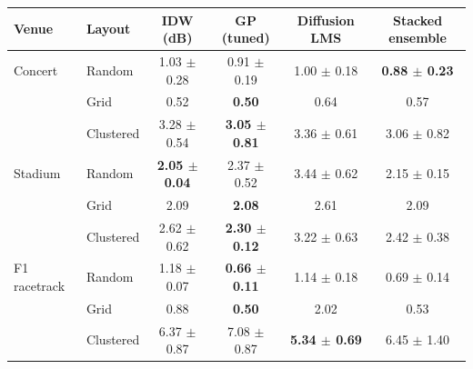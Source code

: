 \begin{tabular}{llcccc}
\toprule
Venue & Layout & IDW (dB) & GP (tuned) & Diffusion LMS & Stacked ensemble \\
\midrule
Concert & Random & 1.03 $\pm$ 0.28 & 0.91 $\pm$ 0.19 & 1.00 $\pm$ 0.18 & \textbf{0.88 $\pm$ 0.23} \\
 & Grid & 0.52 & \textbf{0.50} & 0.64 & 0.57 \\
 & Clustered & 3.28 $\pm$ 0.54 & \textbf{3.05 $\pm$ 0.81} & 3.36 $\pm$ 0.61 & 3.06 $\pm$ 0.82 \\
\midrule
Stadium & Random & \textbf{2.05 $\pm$ 0.04} & 2.37 $\pm$ 0.52 & 3.44 $\pm$ 0.62 & 2.15 $\pm$ 0.15 \\
 & Grid & 2.09 & \textbf{2.08} & 2.61 & 2.09 \\
 & Clustered & 2.62 $\pm$ 0.62 & \textbf{2.30 $\pm$ 0.12} & 3.22 $\pm$ 0.63 & 2.42 $\pm$ 0.38 \\
\midrule
F1 racetrack & Random & 1.18 $\pm$ 0.07 & \textbf{0.66 $\pm$ 0.11} & 1.14 $\pm$ 0.18 & 0.69 $\pm$ 0.14 \\
 & Grid & 0.88 & \textbf{0.50} & 2.02 & 0.53 \\
 & Clustered & 6.37 $\pm$ 0.87 & 7.08 $\pm$ 0.87 & \textbf{5.34 $\pm$ 0.69} & 6.45 $\pm$ 1.40 \\
\bottomrule
\end{tabular}
